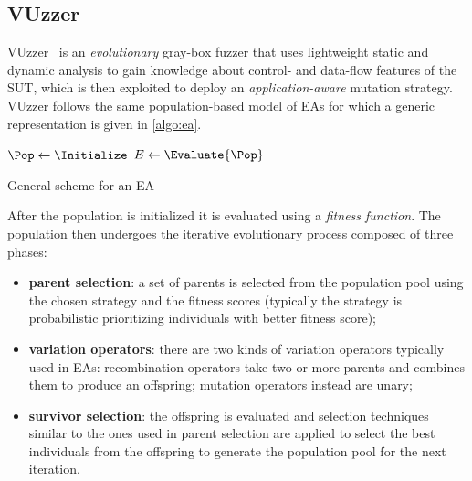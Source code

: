 \subsection{VUzzer}
VUzzer~\cite{rawat2017vuzzer} is an \emph{evolutionary} gray-box fuzzer that
uses lightweight static and dynamic analysis to gain knowledge about control-
and data-flow features of the \ac{SUT}, which is then exploited to deploy an
\emph{application-aware} mutation strategy. VUzzer follows the same
population-based model of \acfp{EA} for which a generic representation is given
in \autoref{algo:ea}.

\begin{algorithm}
    \DontPrintSemicolon%

    $\Pop \leftarrow \Initialize$\;
    $E \leftarrow \Evaluate{\Pop}$\;
    \caption{General scheme for an \acl{EA}}
\label{algo:ea}
\end{algorithm}

After the population is initialized it is evaluated using a \emph{fitness
function}. The population then undergoes the iterative evolutionary process
composed of three phases:

\begin{itemize}
    \item \textbf{parent selection}: a set of parents is selected from the
        population pool using the chosen strategy and the fitness scores
        (typically the strategy is probabilistic prioritizing individuals with
        better fitness score);
    \item \textbf{variation operators}: there are two kinds of variation
        operators typically used in \acp{EA}: recombination operators take two
        or more parents and combines them to produce an offspring; mutation
        operators instead are unary;
    \item \textbf{survivor selection}: the offspring is evaluated and selection
        techniques similar to the ones used in parent selection are applied to
        select the best individuals from the offspring to generate the
        population pool for the next iteration.
\end{itemize}

